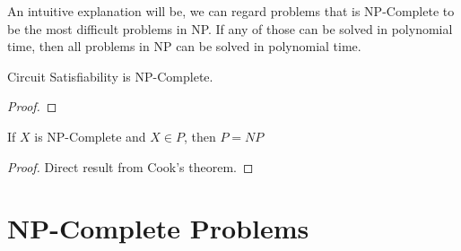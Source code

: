 			An intuitive explanation will be, we can regard problems that is NP-Complete to be the most difficult problems in NP. If any of those can be solved in polynomial time, then all problems in NP can be solved in polynomial time.

			\begin{theorem}
				Circuit Satisfiability is NP-Complete.
			\end{theorem}

			\begin{proof}
				
			\end{proof}

			\begin{theorem}
				If $X$ is NP-Complete and $X \in P$, then $P = NP$
			\end{theorem}

			\begin{proof}
				Direct result from Cook's theorem.
			\end{proof}


		\section{NP-Complete Problems}
			

